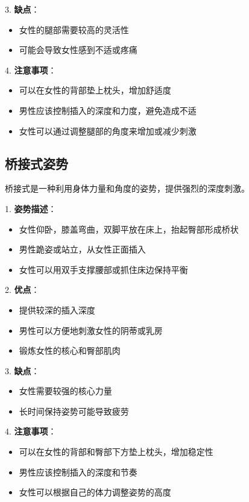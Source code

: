 \documentclass[12pt,UTF8]{ctexbook}
\begin{document}
3. \textbf{缺点}：
  \begin{itemize}
  \item 女性的腿部需要较高的灵活性
  \item 可能会导致女性感到不适或疼痛
  \end{itemize}

4. \textbf{注意事项}：
  \begin{itemize}
  \item 可以在女性的背部垫上枕头，增加舒适度
  \item 男性应该控制插入的深度和力度，避免造成不适
  \item 女性可以通过调整腿部的角度来增加或减少刺激
  \end{itemize}

\subsection{桥接式姿势}

桥接式是一种利用身体力量和角度的姿势，提供强烈的深度刺激。

1. \textbf{姿势描述}：
  \begin{itemize}
  \item 女性仰卧，膝盖弯曲，双脚平放在床上，抬起臀部形成桥状
  \item 男性跪姿或站立，从女性正面插入
  \item 女性可以用双手支撑腰部或抓住床边保持平衡
  \end{itemize}

2. \textbf{优点}：
  \begin{itemize}
  \item 提供较深的插入深度
  \item 男性可以方便地刺激女性的阴蒂或乳房
  \item 锻炼女性的核心和臀部肌肉
  \end{itemize}

3. \textbf{缺点}：
  \begin{itemize}
  \item 女性需要较强的核心力量
  \item 长时间保持姿势可能导致疲劳
  \end{itemize}

4. \textbf{注意事项}：
  \begin{itemize}
  \item 可以在女性的背部和臀部下方垫上枕头，增加稳定性
  \item 男性应该控制插入的深度和节奏
  \item 女性可以根据自己的体力调整姿势的高度
  \end{itemize}
\end{document}
